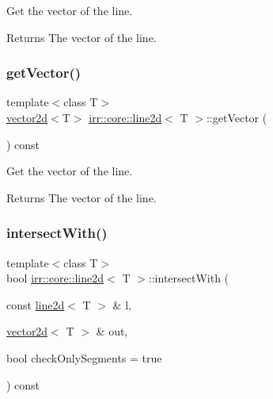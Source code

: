 Get the vector of the line. 

\begin{DoxyReturn}{Returns}
The vector of the line. 
\end{DoxyReturn}
\mbox{\label{classirr_1_1core_1_1line2d_aeb0b7bc3987165abc0eaca7f0e506a59}} 
\subsubsection{\texorpdfstring{get\+Vector()}{getVector()}\hspace{0.1cm}{\footnotesize\ttfamily [2/2]}}
{\footnotesize\ttfamily template$<$class T$>$ \\
\hyperlink{classirr_1_1core_1_1vector2d}{vector2d}$<$T$>$ \hyperlink{classirr_1_1core_1_1line2d}{irr\+::core\+::line2d}$<$ T $>$\+::get\+Vector (\begin{DoxyParamCaption}{ }\end{DoxyParamCaption}) const\hspace{0.3cm}{\ttfamily [inline]}}



Get the vector of the line. 

\begin{DoxyReturn}{Returns}
The vector of the line. 
\end{DoxyReturn}
\mbox{\label{classirr_1_1core_1_1line2d_aafba758c667b6d03b7a6e0f51a5831f0}} 
\subsubsection{\texorpdfstring{intersect\+With()}{intersectWith()}\hspace{0.1cm}{\footnotesize\ttfamily [1/2]}}
{\footnotesize\ttfamily template$<$class T$>$ \\
bool \hyperlink{classirr_1_1core_1_1line2d}{irr\+::core\+::line2d}$<$ T $>$\+::intersect\+With (\begin{DoxyParamCaption}\item[{const \hyperlink{classirr_1_1core_1_1line2d}{line2d}$<$ T $>$ \&}]{l,  }\item[{\hyperlink{classirr_1_1core_1_1vector2d}{vector2d}$<$ T $>$ \&}]{out,  }\item[{bool}]{check\+Only\+Segments = {\ttfamily true} }\end{DoxyParamCaption}) const\hspace{0.3cm}{\ttfamily [inline]}}



